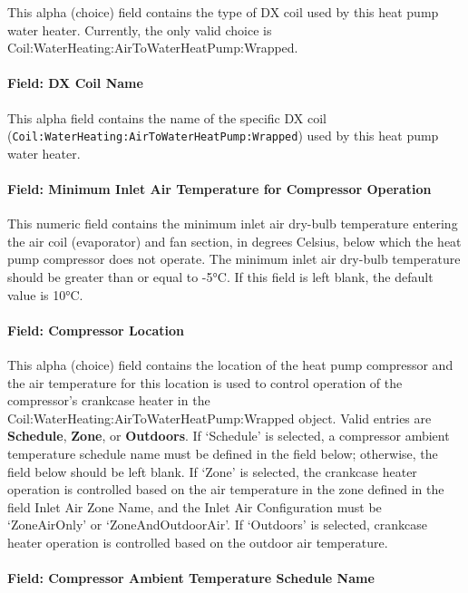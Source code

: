 This alpha (choice) field contains the type of DX coil used by this heat pump water heater. Currently, the only valid choice is Coil:WaterHeating:AirToWaterHeatPump:Wrapped.

\paragraph{Field: DX Coil Name}\label{field-dx-coil-name-1}

This alpha field contains the name of the specific DX coil (\lstinline!Coil:WaterHeating:AirToWaterHeatPump:Wrapped!) used by this heat pump water heater.

\paragraph{Field: Minimum Inlet Air Temperature for Compressor Operation}\label{field-minimum-inlet-air-temperature-for-compressor-operation-1}

This numeric field contains the minimum inlet air dry-bulb temperature entering the air coil (evaporator) and fan section, in degrees Celsius, below which the heat pump compressor does not operate. The minimum inlet air dry-bulb temperature should be greater than or equal to -5°C. If this field is left blank, the default value is 10°C.

\paragraph{Field: Compressor Location}\label{field-compressor-location-1}

This alpha (choice) field contains the location of the heat pump compressor and the air temperature for this location is used to control operation of the compressor's crankcase heater in the Coil:WaterHeating:AirToWaterHeatPump:Wrapped object. Valid entries are \textbf{Schedule}, \textbf{Zone}, or \textbf{Outdoors}. If `Schedule' is selected, a compressor ambient temperature schedule name must be defined in the field below; otherwise, the field below should be left blank. If `Zone' is selected, the crankcase heater operation is controlled based on the air temperature in the zone defined in the field Inlet Air Zone Name, and the Inlet Air Configuration must be `ZoneAirOnly' or `ZoneAndOutdoorAir'. If `Outdoors' is selected, crankcase heater operation is controlled based on the outdoor air temperature.

\paragraph{Field: Compressor Ambient Temperature Schedule Name}\label{field-compressor-ambient-temperature-schedule-name-1}

